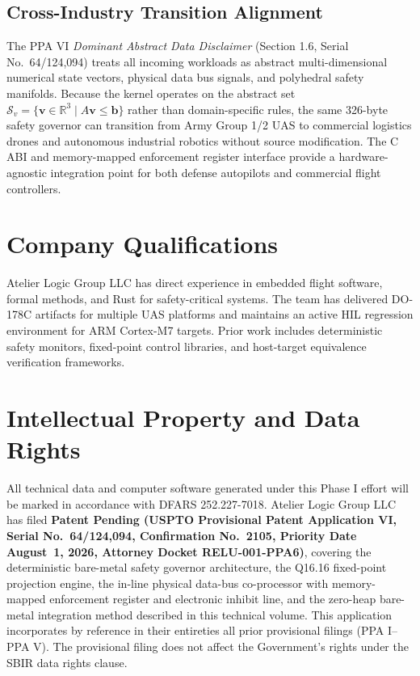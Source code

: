 \documentclass[11pt,oneside]{article}
\begin{document}
\subsection{Cross-Industry Transition Alignment}

The PPA VI \textit{Dominant Abstract Data Disclaimer} (Section 1.6, Serial No.~64/124,094) treats all incoming workloads as abstract multi-dimensional numerical state vectors, physical data bus signals, and polyhedral safety manifolds. Because the kernel operates on the abstract set $\mathcal{S}_v = \{ \mathbf{v} \in \mathbb{R}^3 \mid A \mathbf{v} \le \mathbf{b} \}$ rather than domain-specific rules, the same 326-byte safety governor can transition from Army Group 1/2 UAS to commercial logistics drones and autonomous industrial robotics without source modification. The C ABI and memory-mapped enforcement register interface provide a hardware-agnostic integration point for both defense autopilots and commercial flight controllers.


\section{Company Qualifications}

Atelier Logic Group LLC has direct experience in embedded flight software, formal methods, and Rust for safety-critical systems. The team has delivered DO-178C artifacts for multiple UAS platforms and maintains an active HIL regression environment for ARM Cortex-M7 targets. Prior work includes deterministic safety monitors, fixed-point control libraries, and host-target equivalence verification frameworks.

\section{Intellectual Property and Data Rights}

All technical data and computer software generated under this Phase I effort will be marked in accordance with DFARS 252.227-7018. Atelier Logic Group LLC has filed \textbf{Patent Pending (USPTO Provisional Patent Application VI, Serial No.~64/124,094, Confirmation No.~2105, Priority Date August~1, 2026, Attorney Docket RELU-001-PPA6)}, covering the deterministic bare-metal safety governor architecture, the Q16.16 fixed-point projection engine, the in-line physical data-bus co-processor with memory-mapped enforcement register and electronic inhibit line, and the zero-heap bare-metal integration method described in this technical volume. This application incorporates by reference in their entireties all prior provisional filings (PPA I--PPA V). The provisional filing does not affect the Government's rights under the SBIR data rights clause.
\end{document}
